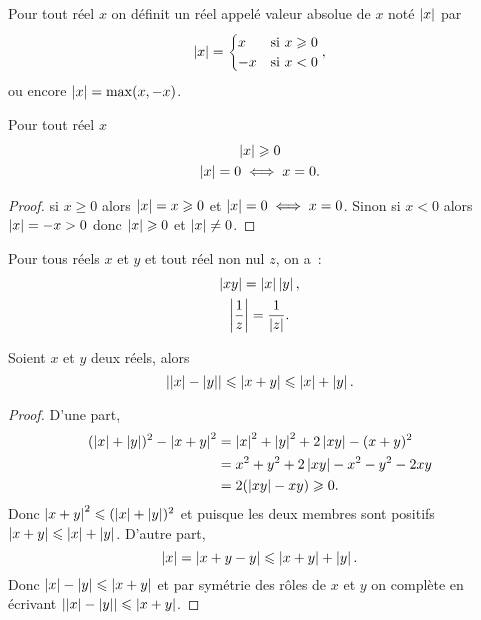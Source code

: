 \begin{defdef}
  Pour tout réel $x$ on définit un réel appelé valeur absolue de $x$ noté $\abs{x}$ par
  \begin{equation}
    \abs{x}=\begin{cases} x & \text{si } x\geqslant 0 \\ -x & \text{si } x<0\end{cases},
  \end{equation}
ou encore $\abs{x}=\max(x,-x)$.
\end{defdef}
\begin{prop}
  Pour tout réel $x$
  \begin{gather}
    \abs{x}\geqslant 0 \\
    \abs{x}=0 \iff x=0.
  \end{gather}
\end{prop}
\begin{proof}
  si $x\geqslant 0$ alors $\abs{x}=x\geqslant 0$ et $\abs{x}=0 \iff x=0$. Sinon si $x<0$ alors $\abs{x}=-x>0$ donc $\abs{x}\geqslant 0$ et $\abs{x}\neq 0$.
\end{proof}
\begin{prop}
  Pour tous réels $x$ et $y$ et tout réel non nul $z$, on a~:
  \begin{gather}
    \abs{xy}=\abs{x}\abs{y}, \\ 
    \abs{\frac{1}{z}}=\frac{1}{\abs{z}}.
  \end{gather}
\end{prop}
\begin{prop}
  Soient $x$ et $y$ deux réels, alors
  \begin{equation}
    \abs{\abs{x}-\abs{y}}\leqslant \abs{x+y} \leqslant \abs{x}+\abs{y}.
  \end{equation}
\end{prop}
\begin{proof}
  D'une part,
  \begin{align}
    (\abs{x}+\abs{y})^2-\abs{x+y}^2 &=\abs{x}^2+\abs{y}^2+2\abs{xy}-(x+y)^2\\
    &=x^2+y^2+2\abs{xy}-x^2-y^2-2xy\\
    &=2(\abs{xy}-xy)\geqslant 0.
  \end{align}
Donc $\abs{x+y}^2\leqslant (\abs{x}+\abs{y})^2$ et puisque les deux membres sont positifs $\abs{x+y}\leqslant \abs{x}+\abs{y}$. D'autre part,
\begin{equation}
  \abs{x}=\abs{x+y-y}\leqslant \abs{x+y}+\abs{y}.
\end{equation}
Donc $\abs{x}-\abs{y}\leqslant \abs{x+y}$ et par symétrie des rôles de $x$ et $y$ on complète en écrivant $\abs{\abs{x}-\abs{y}}\leqslant \abs{x+y}$.
\end{proof}
